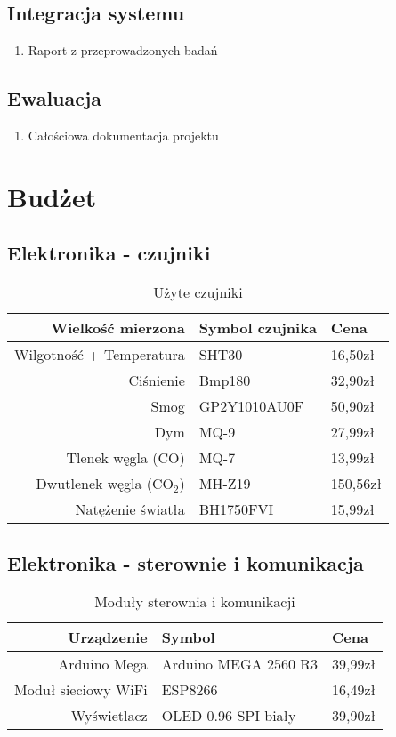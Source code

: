 \documentclass[10pt, a4paper]{article}
\begin{document}
\subsection{Integracja systemu}
\begin{enumerate}
	\item Raport z przeprowadzonych badań
	\end{enumerate}
\subsection{Ewaluacja}
	\begin{enumerate}
	\item Całościowa dokumentacja projektu
	\end{enumerate}

\section{Budżet}
\subsection{Elektronika - czujniki}

\begin{table}[H]
		\centering
		\begin{tabular}{|r|l|l|} \hline
			\textbf{Wielkość mierzona} & \textbf{Symbol czujnika} & \textbf{Cena}\\
			\hline
			Wilgotność + Temperatura & SHT30 & 16,50zł \\
			Ciśnienie & Bmp180 & 32,90zł\\
			Smog & GP2Y1010AU0F & 50,90zł \\
			Dym & MQ-9 & 27,99zł \\
			Tlenek węgla (CO) & MQ-7 & 13,99zł\\
			Dwutlenek węgla (CO$_2$) & MH-Z19 & 150,56zł\\
			Natężenie światła & BH1750FVI & 15,99zł\\ 
			\hline
		\end{tabular}
		\caption{Użyte czujniki}
		\label{tab:Czujniki}
	\end{table}


\subsection{Elektronika - sterownie i komunikacja}

\begin{table}[H]
		\centering
		\begin{tabular}{|r|l|l|} \hline
			\textbf{Urządzenie} & \textbf{Symbol} & \textbf{Cena}\\
			\hline
			Arduino Mega & Arduino MEGA 2560 R3 & 39,99zł \\
			Moduł sieciowy WiFi & ESP8266 & 16,49zł\\
			Wyświetlacz & OLED 0.96 SPI biały & 39,90zł \\ \hline
		\end{tabular}
		\caption{Moduły sterownia i komunikacji}
		\label{tab:Sterowanie}
	\end{table}
	
\end{document}
